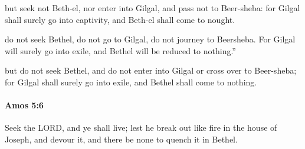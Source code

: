 			\begin{versebox}
					\item[BHS] 
					\item[LXX] 
					\item[ASV] but seek not Beth-el, nor enter into Gilgal, and pass not to Beer-sheba: for Gilgal shall surely go into captivity, and Beth-el shall come to nought.
					\item[NIV] do not seek Bethel, do not go to Gilgal, do not journey to Beersheba. For Gilgal will surely go into exile, and Bethel will be reduced to nothing.”
					\item[NRSV] but do not seek Bethel, and do not enter into Gilgal or cross over to Beer-sheba; for Gilgal shall surely go into exile, and Bethel shall come to nothing.
			\end{versebox}

		\paragraph{Amos 5:6} %
			\label{AMOS-5-6}

			Seek the LORD, and ye shall live; lest he break out like fire in the house of Joseph, and devour it, and there be none to quench it in Bethel.

